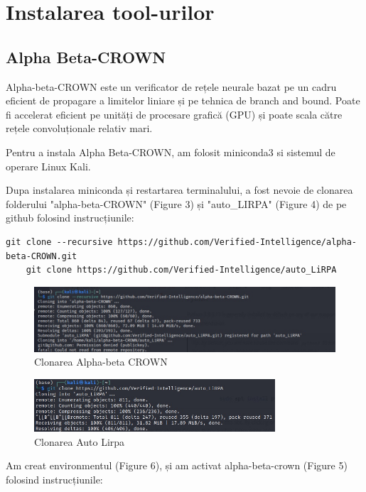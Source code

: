 \documentclass[12pt,a4paper]{article}
\theoremstyle{definition}
\theoremstyle{remark}
\begin{document}
\section{Instalarea tool-urilor}
\subsection{Alpha Beta-CROWN}
Alpha-beta-CROWN\cite{abcrown} este un verificator de rețele neurale bazat pe un cadru eficient de propagare a limitelor liniare și pe tehnica de branch and bound. Poate fi accelerat eficient pe unități de procesare grafică (GPU) și poate scala către rețele convoluționale relativ mari. \par
Pentru a instala Alpha Beta-CROWN, am folosit miniconda3 si sistemul de operare Linux Kali. \par
Dupa instalarea miniconda \cite{miniconda} și restartarea terminalului, a fost nevoie de clonarea folderului "alpha-beta-CROWN"\cite{git1} (Figure 3) și "auto\_LIRPA"\cite{git2} (Figure 4) de pe github folosind instrucțiunile: \par
\begin{lstlisting}[style=bashstyle]
    git clone --recursive https://github.com/Verified-Intelligence/alpha-beta-CROWN.git
    git clone https://github.com/Verified-Intelligence/auto_LiRPA
\end{lstlisting}


   
\begin{figure}[h!]
  \centering
    \includegraphics[width=1\textwidth]{a_b_crown.jpg}
    \caption{Clonarea Alpha-beta CROWN}
\end{figure}
\begin{figure}[h!]
  \centering
    \includegraphics[width=0.8\textwidth]{libra.jpg}
    \caption{Clonarea Auto Lirpa}
\end{figure}

Am creat environmentul (Figure 6), și am activat alpha-beta-crown (Figure 5) folosind instrucțiunile: \par
\end{document}
